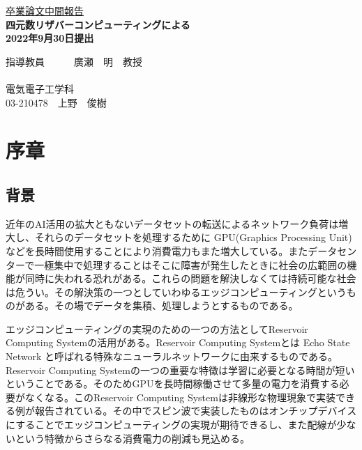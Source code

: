 \documentclass[uplatex,a4paper,10pt]{jsarticle}
\begin{document}
\begin{center}
\vspace*{3cm} \underline{\HUGE 卒業論文中間報告 }\\
\vspace{1cm}
\bf{ \Huge 四元数リザバーコンピューティングによる\\}
\vspace{3cm}
\huge 2022年9月30日提出 \\
\vspace{3cm}
\end{center}
\begin{minipage}{0.4\hsize}
\hspace{1zw}
\end{minipage}
\begin{center}
\begin{minipage}{0.7\hsize}
{\huge 指導教員　　　廣瀬　明　教授\\}
\vspace{1cm}\\
\centering
{\huge 電気電子工学科\\}
{\huge 03-210478　上野　俊樹}
\end{minipage}
\end{center}


\newpage
\tableofcontents

\newpage 

\section{序章}
\subsection{背景}
近年のAI活用の拡大ともないデータセットの転送によるネットワーク負荷は増大し、それらのデータセットを処理するために GPU(Graphics Processing Unit) などを長時間使用することにより消費電力もまた増大している。またデータセンターで一極集中で処理することはそこに障害が発生したときに社会の広範囲の機能が同時に失われる恐れがある。これらの問題を解決しなくては持続可能な社会は危うい。その解決策の一つとしていわゆるエッジコンピューティングというものがある。その場でデータを集積、処理しようとするものである。

エッジコンピューティングの実現のための一つの方法としてReservoir Computing Systemの活用がある。Reservoir Computing Systemとは Echo State Network \cite{echostate}と呼ばれる特殊なニューラルネットワークに由来するものである。Reservoir Computing Systemの一つの重要な特徴は学習に必要となる時間が短いということである。そのためGPUを長時間稼働させて多量の電力を消費する必要がなくなる。このReservoir Computing Systemは非線形な物理現象で実装できる例が報告されている\cite{physical_reservoir}。その中でスピン波で実装したものはオンチップデバイスにすることでエッジコンピューティングの実現が期待できるし、また配線が少ないという特徴からさらなる消費電力の削減も見込める\cite{spin_wave_reservoir}。
\end{document}
